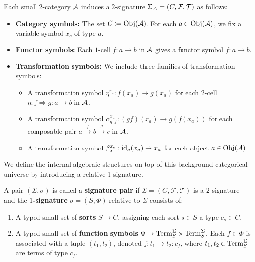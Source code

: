 \begin{example}\label{ex:2catInducesSignature}
Each small $2$-category $\mathcal{A}$ induces a $2$-signature $\Sigma_{\mathcal{A}} = (C, \mathcal{F}, \mathcal{T})$ as follows:
\begin{itemize}
    \item \textbf{Category symbols:} The set $C \coloneqq \mathrm{Obj}(\mathcal{A})$. For each $a \in \mathrm{Obj}(\mathcal{A})$, we fix a variable symbol $x_a$ of type $a$.
    \item \textbf{Functor symbols:} Each $1$-cell $f \colon a \to b$ in $\mathcal{A}$ gives a functor symbol $f \colon a \to b$.
    \item \textbf{Transformation symbols:} We include three families of transformation symbols:
    \begin{itemize}
        \item A transformation symbol $\eta^{x_a} \colon f(x_a) \to g(x_a)$ for each $2$-cell $\eta \colon f \Rightarrow g \colon a \to b$ in $\mathcal{A}$.
        \item A transformation symbol $\alpha^{x_a}_{g,f} \colon (gf)(x_a) \to g(f(x_a))$ for each composable pair $a \xrightarrow{f} b \xrightarrow{g} c$ in $\mathcal{A}$.
        \item A transformation symbol $\beta^{x_a}_a \colon \mathrm{id}_a(x_a) \to x_a$ for each object $a \in \mathrm{Obj}(\mathcal{A})$.
    \end{itemize}
\end{itemize}
\end{example}

We define the internal algebraic structures on top of this background categorical universe by introducing a relative $1$-signature.

\begin{definition}
   A pair $(\Sigma,\sigma)$ is called a \textbf{signature pair} if $\Sigma = (C,\mathcal{F},\mathcal{T})$ is a $2$-signature and the \textbf{$1$-signature} $\sigma = (S, \Phi)$ relative to $\Sigma$ consists of:
   \begin{enumerate}
       \item A typed small set of \textbf{sorts} $S \to C$, assigning each sort $s \in S$ a type $c_s \in C$.
       \item A typed small set of \textbf{function symbols} $\Phi \to \mathrm{Term}_{S}^\Sigma \times \mathrm{Term}_{S}^\Sigma$. Each $f \in \Phi$ is associated with a tuple $(t_1,t_2)$, denoted $f\colon t_1 \to t_2 \colon c_f$, where $t_1, t_2\in \mathrm{Term}_S^\Sigma$ are terms of type $c_f$.
   \end{enumerate}
\end{definition}

